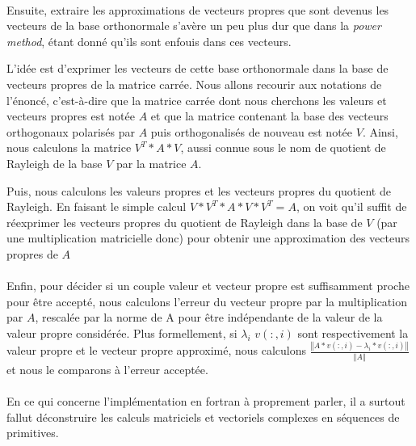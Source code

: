 \documentclass[a4paper,12pt]{article}
\newcommand{\norme}[1]{\left\Vert #1\right\Vert}
\begin{document}
    \paragraph{}
    Ensuite, extraire les approximations de vecteurs propres que sont devenus
    les vecteurs de la base orthonormale s'avère un peu plus dur que dans la
    \emph{power method}, étant donné qu'ils sont \og enfouis \fg dans ces vecteurs.

    L'idée est d'exprimer les vecteurs de cette base orthonormale dans la
    base de vecteurs propres de la matrice carrée. Nous
    allons recourir aux notations de l'énoncé, c'est-à-dire que la matrice
    carrée dont nous cherchons les valeurs et vecteurs propres est notée $A$
    et que la matrice contenant la base des vecteurs orthogonaux polarisés
    par $A$ puis orthogonalisés de nouveau est notée $V$. Ainsi, nous calculons
    la matrice $V^T*A*V$, aussi connue sous le nom de quotient de Rayleigh de
    la base $V$ par la matrice $A$.

    Puis, nous calculons les valeurs propres et les vecteurs propres du quotient
    de Rayleigh. En faisant le simple calcul $V*V^T*A*V*V^T = A$, on voit qu'il
    suffit de réexprimer les vecteurs propres du quotient de Rayleigh dans la base
    de $V$ (par une multiplication matricielle donc) pour obtenir une approximation
    des vecteurs propres de $A$

    \paragraph{}
    Enfin, pour décider si un couple valeur et vecteur propre est suffisamment proche
    pour être accepté, nous calculons l'erreur du vecteur propre par la multiplication
    par $A$, rescalée par la norme de A pour être indépendante de la valeur de la
    valeur propre considérée. Plus formellement, si $\lambda_i$ $v(:,i)$ sont
    respectivement la valeur propre et le vecteur propre approximé, nous calculons
    $\frac{\norme{A*v(:,i) - \lambda_i*v(:,i)}}{\norme{A}}$ et nous le comparons
    à l'erreur acceptée.

    \bigskip
    \paragraph{}
    En ce qui concerne l'implémentation en fortran à proprement parler, il a surtout
    fallut déconstruire les calculs matriciels et vectoriels complexes en séquences
    de primitives.
\end{document}
